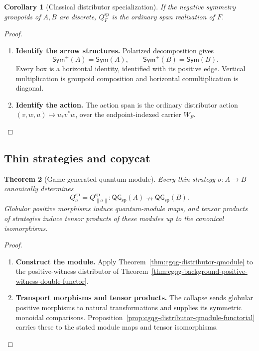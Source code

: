 \documentclass[oneside]{article}
\newcommand{\Sym}{\mathsf{Sym}}
\newcommand{\QG}{\mathsf{QG}}
\newcommand{\xnrightarrow}[1]{\mathrel{\overset{#1}{\nrightarrow}}}
\theoremstyle{plain}
\newtheorem{theorem}{Theorem}[section]
\newtheorem{corollary}[theorem]{Corollary}
\theoremstyle{definition}
\theoremstyle{remark}
\begin{document}
\begin{corollary}[Classical distributor specialization]
\label{cor:cgqg-qmodule-classical-variance}
If the negative symmetry groupoids of \(A,B\) are discrete,
\(Q_F^{\mathrm{sp}}\) is the ordinary span realization of \(F\).
\end{corollary}
\begin{proof}
    \leavevmode
    \begin{enumerate}[beginpenalty=10000]
        \item \textbf{Identify the arrow structures.}
        Polarized decomposition gives
        \[
        \Sym^+(A)=\Sym(A),\qquad \Sym^+(B)=\Sym(B).
        \]
        Every box is a horizontal identity,
        identified with its positive edge. Vertical multiplication is
        groupoid composition and horizontal comultiplication is diagonal.

        \item \textbf{Identify the action.}
        The action span is the ordinary distributor action
        \((v,w,u)\mapsto u_*v^*w\), over the endpoint-indexed carrier \(W_F\). \qedhere
    \end{enumerate}
\end{proof}

\subsection{Thin strategies and copycat}
\label{subsec:cgqg-thin-strategy-qmodules}

\begin{theorem}[Game-generated quantum module]
\label{thm:cgqg-game-generated-qmodule}
Every thin strategy \(\sigma:A\to B\) canonically determines
\[
 Q_\sigma^{\mathrm{sp}}=
 Q_{\lVert\sigma\rVert}^{\mathrm{sp}}:
 \QG_{\mathrm{sp}}(A)\xnrightarrow{}\QG_{\mathrm{sp}}(B).
\]
Globular positive morphisms induce quantum-module maps, and tensor
products of strategies induce tensor products of these modules up to
the canonical isomorphisms.
\end{theorem}
\begin{proof}
    \leavevmode
    \begin{enumerate}[beginpenalty=10000]
        \item \textbf{Construct the module.}
        Apply Theorem~\ref{thm:cgqg-distributor-qmodule} to the
        positive-witness distributor of
        Theorem~\ref{thm:cgqg-background-positive-witness-double-functor}.

        \item \textbf{Transport morphisms and tensor products.}
        The collapse sends globular positive morphisms to natural
        transformations and supplies its symmetric monoidal comparisons.
        Proposition~\ref{prop:cgqg-distributor-qmodule-functorial}
        carries these to the stated module maps and tensor isomorphisms. \qedhere
    \end{enumerate}
\end{proof}
\end{document}
